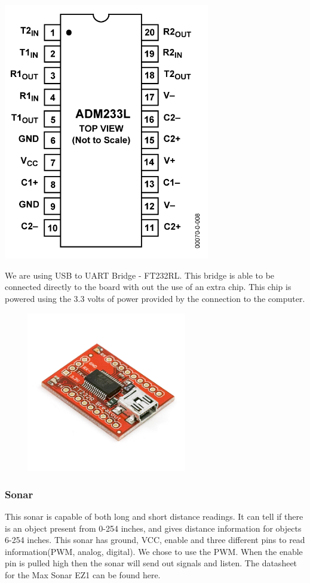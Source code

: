   \begin{minipage}{6.5in}
    \includegraphics[width=90mm]{imageSources/serialUART.png}
  \centering
  \label{serialUART}
\end{minipage}


We are using USB to UART Bridge - FT232RL. This bridge is able to be connected directly to the board with out the use of an extra chip. This chip is powered using the 3.3 volts of power provided by the connection to the computer. 


  \begin{minipage}{6.5in}
    \centering
    \includegraphics[width=90mm, height= 70mm]{imageSources/usbUART.png}
  \label{usbUART}
\end{minipage}

\subsubsection{Sonar}
This sonar is capable of both long and short distance readings. It can tell if there is an object present from 0-254 inches, and gives distance information for objects 6-254 inches. This sonar has ground, VCC, enable and three different pins to read information(PWM, analog, digital). We chose to use the PWM.  When the enable pin is pulled high then the sonar will send out signals and listen.  The datasheet for the Max Sonar EZ1 can be found here.

